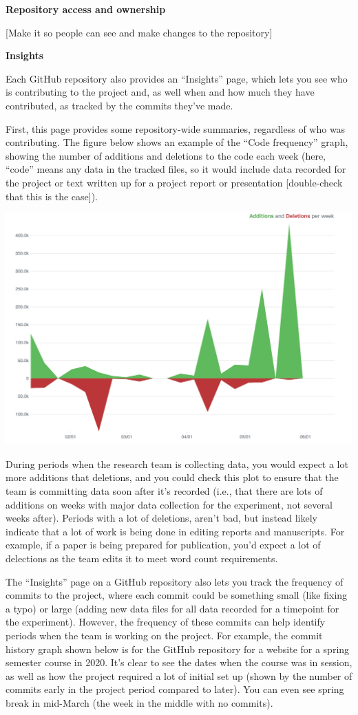 \documentclass[]{tufte-book}
\begin{document}
\textbf{Repository access and ownership}

{[}Make it so people can see and make changes to the repository{]}

\textbf{Insights}

Each GitHub repository also provides an ``Insights'' page, which lets you see who is
contributing to the project and, as well when and how much they have contributed, as
tracked by the commits they've made.

First, this page provides some repository-wide summaries, regardless of who was
contributing. The figure below shows an example of the ``Code frequency'' graph,
showing the number of additions and deletions to the code each week (here, ``code'' means
any data in the tracked files, so it would include data recorded for the project or
text written up for a project report or presentation {[}double-check that this is the
case{]}).

\includegraphics[width=24in]{figures/github_code_frequency}

During periods when the research team is collecting data, you would expect
a lot more additions that deletions, and you could check this plot to ensure that the
team is committing data soon after it's recorded (i.e., that there are lots of additions
on weeks with major data collection for the experiment, not several weeks after).
Periods with a lot of deletions, aren't bad, but instead likely indicate that a lot of
work is being done in editing reports and manuscripts. For example, if a paper is being
prepared for publication, you'd expect a lot of delections as the team edits it to meet
word count requirements.

The ``Insights'' page on a GitHub repository also lets you track the frequency of commits
to the project, where each commit could be something small (like fixing a typo) or
large (adding new data files for all data recorded for a timepoint for the experiment).
However, the frequency of these commits can help identify periods when the team is working
on the project. For example, the commit history graph shown below is for the GitHub
repository for a website for a spring semester course in 2020. It's clear to see the
dates when the course was in session, as well as how the project required a lot of
initial set up (shown by the number of commits early in the project period compared
to later). You can even see spring break in mid-March (the week in the middle with no
commits).
\end{document}
